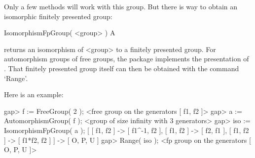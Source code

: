 Only a few methods will work with this group. But there is way to
obtain an isomorphic finitely presented group:

\>IsomorphismFpGroup( <group> ) A

returns an isomorphism of <group> to a finitely presented group.  
For automorphism groups of free groups, the {\FGA} package implements
the presentation of \cite{Neumann33}.
That finitely presented group itself can then be obtained with the
command `Range'.

Here is an example:

\beginexample
gap> f := FreeGroup( 2 );
<free group on the generators [ f1, f2 ]>
gap> a := AutomorphismGroup( f );
<group of size infinity with 3 generators>
gap> iso := IsomorphismFpGroup( a );
[ [ f1, f2 ] -> [ f1^-1, f2 ], [ f1, f2 ] -> [ f2, f1 ], 
  [ f1, f2 ] -> [ f1*f2, f2 ] ] -> [ O, P, U ]
gap> Range( iso );
<fp group on the generators [ O, P, U ]>
\endexample



